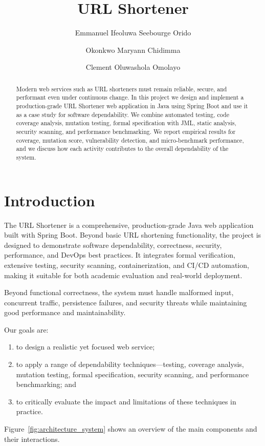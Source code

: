 \documentclass[sigconf]{acmart}
\title{URL Shortener}
\author{Emmanuel Ifeoluwa Seebourge Orido}
\affiliation{%
  \institution{University of Salerno}
  \country{Italy}
}
\author{Okonkwo Maryann Chidimma}
\affiliation{%
  \institution{University of Salerno}
  \country{Italy}
}
\author{Clement Oluwashola Omolayo}
\affiliation{%
  \institution{University of Salerno}
  \country{Italy}
}
\begin{document}
\begin{abstract}
Modern web services such as URL shorteners must remain reliable, secure, and performant even under continuous change. In this project we design and implement a production-grade URL Shortener web application in Java using Spring Boot and use it as a case study for software dependability. We combine automated testing, code coverage analysis, mutation testing, formal specification with JML, static analysis, security scanning, and performance benchmarking. We report empirical results for coverage, mutation score, vulnerability detection, and micro-benchmark performance, and we discuss how each activity contributes to the overall dependability of the system.
\end{abstract}

\maketitle

\section{Introduction}
The URL Shortener is a comprehensive, production-grade Java web application built with Spring Boot. Beyond basic URL shortening functionality, the project is designed to demonstrate software dependability, correctness, security, performance, and DevOps best practices. It integrates formal verification, extensive testing, security scanning, containerization, and CI/CD automation, making it suitable for both academic evaluation and real-world deployment.

Beyond functional correctness, the system must handle malformed input, concurrent traffic, persistence failures, and security threats while maintaining good performance and maintainability.

Our goals are:
\begin{enumerate}
  \item to design a realistic yet focused web service;
  \item to apply a range of dependability techniques—testing, coverage analysis, mutation testing, formal specification, security scanning, and performance benchmarking; and
  \item to critically evaluate the impact and limitations of these techniques in practice.
\end{enumerate}

Figure~\ref{fig:architecture_system} shows an overview of the main components and their interactions.
\end{document}

